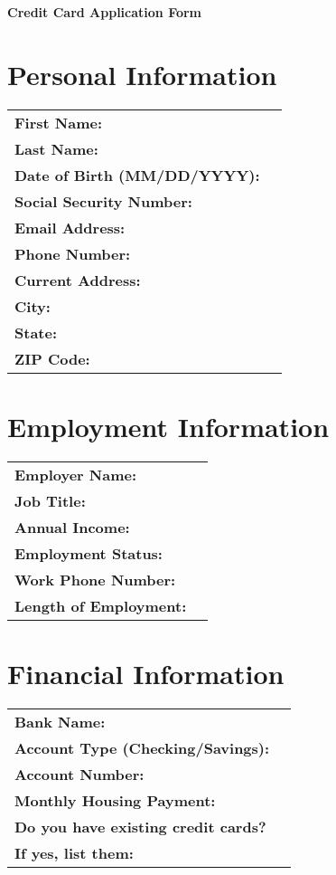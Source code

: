 \documentclass[12pt]{article}
\begin{document}
\begin{center}
    {\LARGE \textbf{Credit Card Application Form}}
\end{center}

\vspace{1em}

\section*{Personal Information}

\begin{tabular}{>{\bfseries}l p{4in}}
First Name: & \hrulefill \\
Last Name: & \hrulefill \\
Date of Birth (MM/DD/YYYY): & \hrulefill \\
Social Security Number: & \hrulefill \\
Email Address: & \hrulefill \\
Phone Number: & \hrulefill \\
Current Address: & \hrulefill \\
City: & \hrulefill \\
State: & \hrulefill \\
ZIP Code: & \hrulefill \\
\end{tabular}

\vspace{1em}

\section*{Employment Information}

\begin{tabular}{>{\bfseries}l p{4in}}
Employer Name: & \hrulefill \\
Job Title: & \hrulefill \\
Annual Income: & \hrulefill \\
Employment Status: & \hrulefill \\
Work Phone Number: & \hrulefill \\
Length of Employment: & \hrulefill \\
\end{tabular}

\vspace{1em}

\section*{Financial Information}

\begin{tabular}{>{\bfseries}l p{4in}}
Bank Name: & \hrulefill \\
Account Type (Checking/Savings): & \hrulefill \\
Account Number: & \hrulefill \\
Monthly Housing Payment: & \hrulefill \\
Do you have existing credit cards? & \hrulefill \\
If yes, list them: & \hrulefill \\
\end{tabular}
\end{document}
